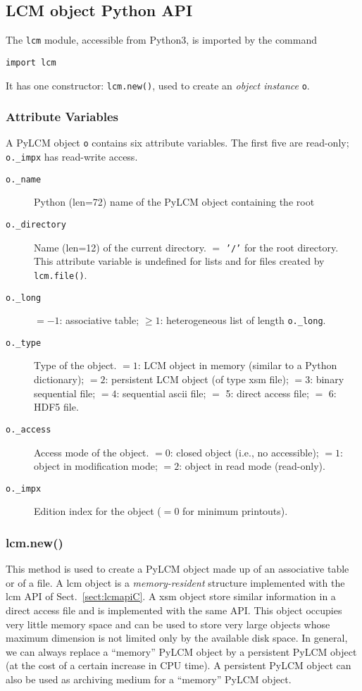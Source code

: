 \subsection{LCM object Python API} \label {sect: APIP}

The {\tt lcm} module, accessible from Python3, is imported by the command
\begin{verbatim}
import lcm
\end{verbatim}
It has one constructor: {\tt lcm.new()}, used to create an {\sl object instance} {\tt o}.

\subsubsection{Attribute Variables }

A PyLCM object {\tt o} contains six attribute variables. The first five are read-only; {\tt o.\_impx} has read-write access.

\begin {description}
\item [{\tt o.\_name}] Python (len=72) name of the PyLCM object containing the root
\item [{\tt o.\_directory}] Name (len=12) of the current directory. $=$ {\tt '/'} for the
root directory. This attribute variable is undefined for
lists and for files created by {\tt lcm.file()}.
\item [{\tt o.\_long}] $ = - 1 $: associative table; $ \ge 1 $: heterogeneous list of length {\tt o.\_long}.
\item [{\tt o.\_type}] Type of the object. $ = 1 $: LCM object in memory
(similar to a Python dictionary); $ = 2 $: persistent LCM object (of type {\sc xsm} file);
$ = 3 $: binary sequential file; $ = 4 $: sequential {\sc ascii} file; $=$ 5:
direct access file; $=$ 6: HDF5 file.
\item [{\tt o.\_access}] Access mode of the object. $ = 0 $: closed object (i.e., no
accessible); $ = 1 $: object in modification mode; $ = 2 $: object in read mode
(read-only).
\item [{\tt o.\_impx}] Edition index for the object ($=0$ for minimum printouts).
\end {description}

\subsubsection{lcm.new()}

This method is used to create a PyLCM object made up of an associative table or of a file. A {\sc lcm} object is a {\sl memory-resident} structure
implemented with the {\sc lcm} API of Sect.~\ref{sect:lcmapiC}. A {\sc xsm} object store similar information in a direct access file and is implemented with the same API. This object occupies very little memory space and can be
used to store very large objects whose maximum dimension is not
limited only by the available disk space. In general, we can always replace
a ``memory'' PyLCM object  by a persistent PyLCM object (at the cost of a certain
increase in CPU time). A persistent PyLCM object can
also be used as archiving medium for a ``memory'' PyLCM object.

